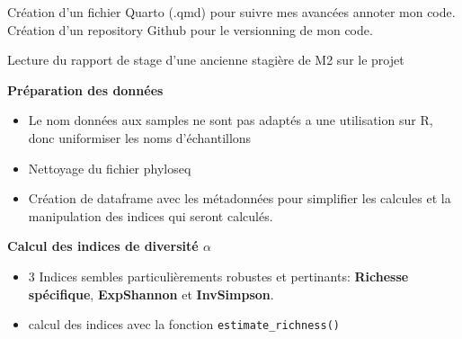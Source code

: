 \documentclass[12pt,a4paper]{report}
\begin{document}
\vspace{0.5cm}

\begin{Méthodologie}{}
    Création d'un fichier Quarto (.qmd) pour suivre mes avancées annoter mon code.
    Création d'un repository Github pour le versionning de mon code.

    Lecture du rapport de stage d'une ancienne stagière de M2 sur le projet 

    \textbf{Préparation des données}
    \begin{itemize}
        \item Le nom données aux samples ne sont pas adaptés a une utilisation sur R, donc uniformiser les noms d'échantillons
        \item Nettoyage du fichier phyloseq
        \item Création de dataframe avec les métadonnées pour simplifier les calcules et la manipulation des indices qui seront calculés.
    \end{itemize}

    \textbf{Calcul des indices de diversité $\alpha$}
    \begin{itemize}
        \item 3 Indices sembles particulièrements robustes et pertinants: \textbf{Richesse spécifique}, \textbf{ExpShannon} et \textbf{InvSimpson}.
        \item calcul des indices avec la fonction \texttt{estimate\_richness()}
    \end{itemize}  


\end{Méthodologie}
\end{document}

